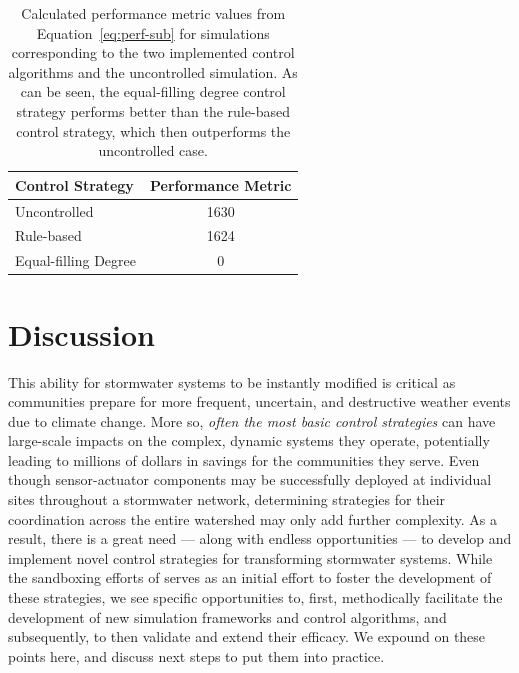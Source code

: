 %
%
%
\begin{table}[ht]
\small
\caption{Calculated performance metric values from Equation~\ref{eq:perf-sub} for  simulations corresponding to the two implemented control algorithms and the uncontrolled simulation. As can be seen, the equal-filling degree control strategy performs better than the rule-based control strategy, which then outperforms the uncontrolled case.}\label{tab:perfmet}
\begin{tabular}{l c}
\toprule
{\centering \textbf{Control Strategy}} & \textbf{Performance Metric} \\\midrule
Uncontrolled & 1630 \\
Rule-based & 1624 \\
Equal-filling Degree & 0 \\
\bottomrule
\end{tabular}
\end{table}
%
%
%
%
%
%
%
%
%
%
%
%
%
%
%
\section{Discussion}
\label{sec:discussion}
%
%
%
This ability for stormwater systems to be instantly modified is critical as communities prepare for more frequent, uncertain, and destructive weather events due to climate change. More so, \emph{often the most basic control strategies} can have large-scale impacts on the complex, dynamic systems they operate, potentially leading to millions of dollars in savings for the communities they serve. Even though sensor-actuator components may be successfully deployed at individual sites throughout a stormwater network, determining strategies for their coordination across the entire watershed may only add further complexity. As a result, there is a great need --- along with endless opportunities --- to develop and implement novel control strategies for transforming stormwater systems. While the sandboxing efforts of \pystorms serves as an initial effort to foster the development of these strategies, we see specific opportunities to, first, methodically facilitate the development of new simulation frameworks and control algorithms, and subsequently, to then validate and extend their efficacy. We expound on these points here, and discuss next steps to put them into practice.

